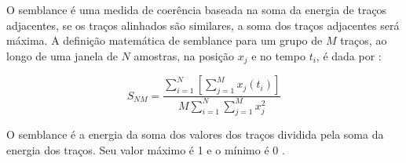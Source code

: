 O semblance é uma medida de coerência baseada na soma da energia de traços adjacentes, se os traços alinhados são similares,
a soma dos traços adjacentes será máxima. A definição matemática de semblance para um grupo de $M$ traços, ao 
longo de uma janela de $N$ amostras, na posição $x_j$ e no tempo $t_i$, é dada por \cite{seg}:

\begin{equation}
\label{eq:2.17}
 S_{NM}=\frac{ \sum_{i=1}^N [\sum_{j=1}^M x_j(t_i)]}{M \sum_{i=1}^N \sum_{j=1}^Mx^2_{j}}
\end{equation}

O semblance é a energia da soma dos valores dos traços dividida pela soma da energia dos traços. 
Seu valor máximo é 1 e o mínimo é 0 \cite{seg}.

